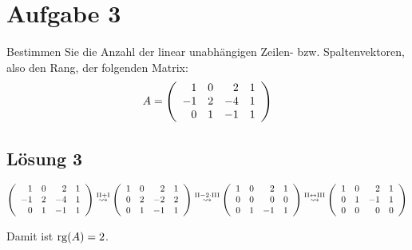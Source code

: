 \documentclass[main.tex]{subfiles}
\begin{document}
\section{Aufgabe 3}
Bestimmen Sie die Anzahl der linear unabhängigen Zeilen- bzw. Spaltenvektoren, also den Rang, der folgenden Matrix:
$$
    A = \eqmatrix{rrrr}{
         1 & 0 &  2 & 1 \\
        -1 & 2 & -4 & 1 \\
         0 & 1 & -1 & 1 \\
    }
$$

\subsection{Lösung 3}

\begin{align*}
    \eqmatrix{rrrr}{
         1 & 0 &  2 & 1 \\
        -1 & 2 & -4 & 1 \\
         0 & 1 & -1 & 1 \\
    } \overset{\ct{II} +\ct{I}}{\leadsto}
    \eqmatrix{rrrr}{
         1 & 0 &  2 & 1 \\
         0 & 2 & -2 & 2 \\
         0 & 1 & -1 & 1 \\
    } \overset{\ct{II} -2\cdot\ct{III}}{\leadsto}
    \eqmatrix{rrrr}{
        1 & 0 &  2 & 1 \\
        0 & 0 & 0 & 0 \\
        0 & 1 & -1 & 1 \\
   } \overset{\ct{II} \leftrightarrow \ct{III}}{\leadsto}
   \eqmatrix{rrrr}{
    1 & 0 &  2 & 1 \\
    0 & 1 & -1 & 1 \\
    0 & 0 & 0 & 0 \\
   }
\end{align*}

Damit ist $\rg(A) = 2$.
\end{document}
